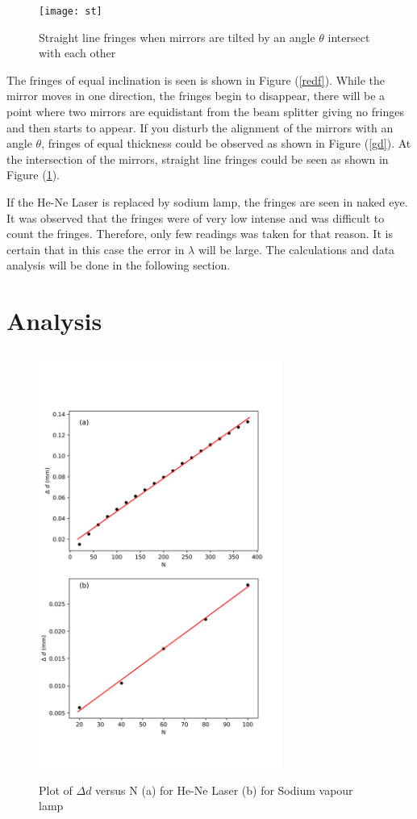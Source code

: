 \documentclass[a4paper, amsfonts, amssymb, amsmath, reprint, showkeys, nofootinbib, twoside]{revtex4-1}
\begin{document}
\begin{figure}%
   \centering
   \texttt{[image: st]} 
   \caption{Straight line fringes when mirrors are tilted by an angle $\theta$ intersect with each other}
   \label{st}
\end{figure}

The fringes of equal inclination is seen is shown in Figure (\ref{redf}). While the mirror moves in one direction, the fringes begin to disappear, there will be a point where two mirrors are equidistant from the beam splitter giving no fringes and then starts to appear. If you disturb the alignment of the mirrors with an angle $\theta$, fringes of equal thickness could be observed as shown in Figure (\ref{gd}). At the intersection of the mirrors, straight line fringes could be seen as shown in Figure (\ref{st}).

If the He-Ne Laser is replaced by sodium lamp, the fringes are seen in naked eye. It was observed that the fringes were of very low intense and was difficult to count the fringes. Therefore, only few readings was taken for that reason. It is certain that in this case the error in $\lambda$ will be large. The calculations and data analysis will be done in the following section. 

\pagebreak

\section{Analysis}
\begin{figure}[htbp] %
   \centering
   \includegraphics[width=8cm, height=14cm]{michelson.jpg} 
   \caption{Plot of $\Delta d$ versus N (a) for He-Ne Laser (b) for Sodium vapour lamp}
   \label{plot}
\end{figure}
\end{document}
